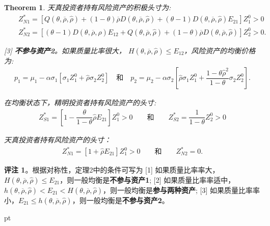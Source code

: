 \documentclass[10.0pt]{article}
\newtheorem{thm}{Theorem}
\begin{document}
\begin{thm}
天真投资者持有风险资产的积极头寸为:
\begin{eqnarray*}
& & Z_{N 1}^* = \left[ Q (\theta, \overline{\rho}, {\hat \rho}) + (1 - \theta) \overline{\rho} D (\theta, \overline{\rho}, {\hat \rho}) + (\theta - 1) D (\theta, \overline{\rho}, {\hat \rho}) E_{2 1} \right] Z_1^0 > 0 \\
& & Z_{N 2}^* = \left[ (\theta - 1) D (\theta, \overline{\rho}, {\hat \rho}) E_{1 2} + Q (\theta, \overline{\rho}, {\hat \rho}) + (1 - \theta) \overline{\rho} D (\theta, \overline{\rho}, {\hat \rho}) \right] Z_2^0 > 0.
\end{eqnarray*}



[3] {\bf 不参与资产2}。如果质量比率很大， $ H (\theta, \overline{\rho}, {\hat \rho}) \leqslant E_{1 2} $，风险资产的均衡价格为:
\begin{eqnarray*}
p_1 = \mu_1 - \alpha \sigma_1 \left[ \sigma_1 Z_1^0 + {\hat \rho} \sigma_2 Z_2^0 \right] \quad \text{和} \quad p_2 = \mu_2 - \alpha \sigma_2 \left[ {\hat \rho} \sigma_1 Z_1^0 + \dfrac{1 - \theta {\hat \rho}^2}{1 - \theta} \sigma_2 Z_2^0 \right].
\end{eqnarray*}

在均衡状态下，精明投资者持有风险资产的头寸:
\begin{eqnarray*}
Z_{S 1}^* = \left[ 1 - \dfrac{\theta}{1 - \theta} {\hat \rho} E_{2 1} \right] Z_1^0 > 0 \qquad \text{和} \qquad Z_{S 2}^* = \dfrac{1}{1 - \theta} Z_2^0 > 0
\end{eqnarray*}

天真投资者持有风险资产的头寸：
\begin{eqnarray*}
Z_{N 1}^* = \left[ 1 + {\hat \rho} E_{2 1} \right] Z_1^0 > 0 \qquad \text{和} \qquad Z_{N 2}^* = 0.
\end{eqnarray*}
\end{thm}



 
{\bf 评注 1}。根据对称性，定理2中的条件可写为
[1] 如果质量比率率大，$ H (\theta, \overline{\rho}, {\hat \rho}) \leqslant E_{2 1} $，则一般均衡是{\bf 不参与资产1};
[2] 如果质量比率率适中，$ h (\theta, \overline{\rho}, {\hat \rho}) < E_{2 1} < H (\theta, \overline{\rho}, {\hat \rho})$，则一般均衡是{\bf 参与两种资产};  
[3] 如果质量比率率小，$ E_{2 1} \leqslant h (\theta, \overline{\rho}, {\hat \rho}) $，则一般均衡是{\bf 不参与资产2}。

 pt
\end{document}
